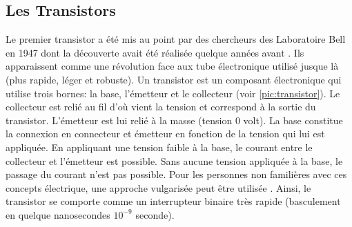 \subsection{Les Transistors}
Le premier transistor a été mis au point par des chercheurs des Laboratoire Bell en 1947 \cite{bardeen1948transistor} dont la découverte avait été réalisée quelque années avant \cite{edgar1930method}. Ils apparaissent comme une révolution face aux tube électronique utilisé jusque là (plus rapide, léger et robuste). Un transistor est un composant électronique qui utilise trois bornes: la base, l'émetteur et le collecteur (voir \autoref{pic:transistor}). Le collecteur est relié au fil d'où vient la tension et correspond à la sortie du transistor. L'émetteur est lui relié à la masse (tension 0 volt). La base constitue la connexion en connecteur et émetteur en fonction de la tension qui lui est appliquée. En appliquant une tension faible à la base, le courant entre le collecteur et l'émetteur est possible. Sans aucune tension appliquée à la base, le passage du courant n'est pas possible. Pour les personnes non familières avec ces concepts électrique, une approche vulgarisée peut être utilisée \cite{JohnLeDuc2017}. Ainsi, le transistor se comporte comme un interrupteur binaire très rapide (basculement en quelque nanosecondes $10^{-9}$ seconde).



